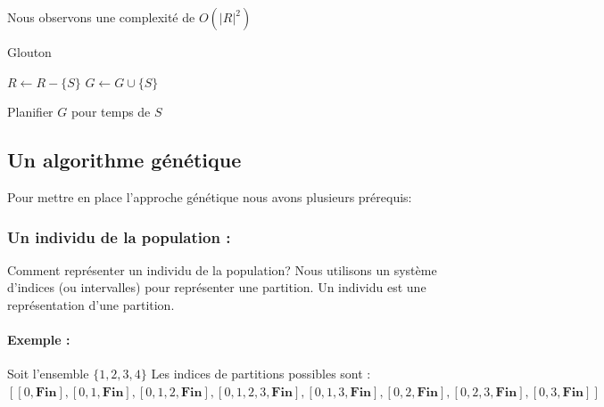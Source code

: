 \documentclass[runningheads]{llncs}
\begin{document}
Nous observons une complexité  de $O(|R|^2)$
\begin{algorithm}[H]
    \caption{Glouton}%
    \label{alg:greedy}
    \begin{algorithmic}[1]
        \State $ R \gets R - \{S\}$
        \State $ G \gets G \cup \{S\}$
      
          \EndIf{}
       \EndFor{}
       Planifier $G$ pour temps de $S$
      \EndWhile{}
    \end{algorithmic}
  \end{algorithm}

\subsection{Un algorithme g\'en\'etique}
Pour mettre en place l'approche génétique nous avons plusieurs prérequis:
\subsubsection{Un individu de la population :} 
Comment représenter un individu de la population?
Nous utilisons un système d'indices (ou intervalles) pour représenter une partition. 
Un individu est une représentation d'une partition.

\paragraph{Exemple : } Soit l'ensemble $\{1, 2, 3, 4\}$ 
Les indices de partitions possibles sont :
$[[0, \textbf{Fin}], [0,1, \textbf{Fin}], [0,1, 2, \textbf{Fin}], [0,1, 2, 3, \textbf{Fin}], [0,1, 3, \textbf{Fin}], [0,2, \textbf{Fin}], [0,2, 3, \textbf{Fin}], [0,3, \textbf{Fin}]]$
\end{document}
